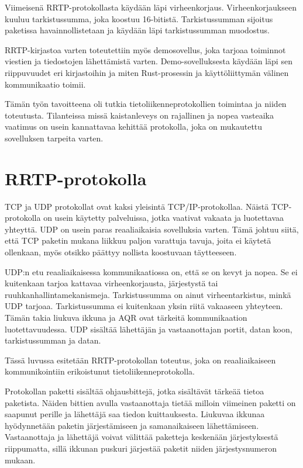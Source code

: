 \documentclass[a4paper,12pt]{article}
\begin{document}
    Viimeisenä RRTP-protokollasta käydään läpi virheenkorjaus. Virheenkorjaukseen kuuluu tarkistussumma, joka koostuu 16-bitistä. Tarkistussumman sijoitus paketissa havainnollistetaan ja käydään läpi
    tarkistussumman muodostus.\par

    RRTP-kirjastoa varten toteutettiin myös demosovellus, joka tarjoaa 
    toiminnot viestien ja tiedostojen lähettämistä varten. Demo-sovelluksesta käydään 
    läpi sen riippuvuudet eri kirjastoihin ja miten Rust-prosessin ja 
    käyttöliittymän välinen kommunikaatio toimii. \par

    Tämän työn tavoitteena oli tutkia tietoliikenneprotokollien toimintaa ja niiden toteutusta. Tilanteissa missä kaistanleveys on rajallinen ja nopea vasteaika vaatimus on usein kannattavaa kehittää protokolla, joka on mukautettu sovelluksen tarpeita varten.

   \section{RRTP-protokolla}\label{sec:protocol}
    TCP ja UDP protokollat ovat kaksi yleisintä TCP/IP-protokollaa.
    Näistä TCP-protokolla on usein käytetty palveluissa, jotka vaativat vakaata ja luotettavaa yhteyttä. UDP on usein paras reaaliaikaisia sovelluksia varten. Tämä johtuu siitä, että TCP paketin mukana liikkuu paljon varattuja tavuja, joita ei käytetä ollenkaan, myös otsikko päättyy nollista koostuvaan täytteeseen.\par
    
    UDP:n etu reaaliaikaisessa kommunikaatiossa on, että se on kevyt ja nopea. Se ei kuitenkaan tarjoa kattavaa virheenkorjausta, järjestystä tai ruuhkanhallintamekanismeja. Tarkistussumma on ainut virheentarkistus, minkä UDP tarjoaa. Tarkistussumma ei kuitenkaan yksin riitä vakaaseen yhteyteen. Tämän takia liukuva ikkuna ja AQR ovat tärkeitä kommunikaation luotettavuudessa. UDP sisältää
    lähettäjän ja vastaanottajan portit, datan koon, tarkistussumman ja datan.
    \cite{KumarSurveyUDP}
    \par
   
    Tässä luvussa esitetään RRTP-protokollan toteutus, joka on reaaliaikaiseen kommunikointiin erikoistunut tietoliikenneprotokolla.\par

    Protokollan paketti sisältää ohjausbittejä, jotka sisältävät tärkeää tietoa paketista. Näiden bittien avulla vastaanottaja tietää milloin viimeinen paketti on saapunut perille ja lähettäjä saa tiedon kuittauksesta. 
    Liukuvaa ikkunaa hyödynnetään paketin järjestämiseen ja samanaikaiseen lähettämiseen.
    Vastaanottaja ja lähettäjä voivat välittää paketteja keskenään järjestyksestä riippumatta, sillä ikkunan puskuri järjestää paketit niiden järjestysnumeron mukaan.
\end{document}
